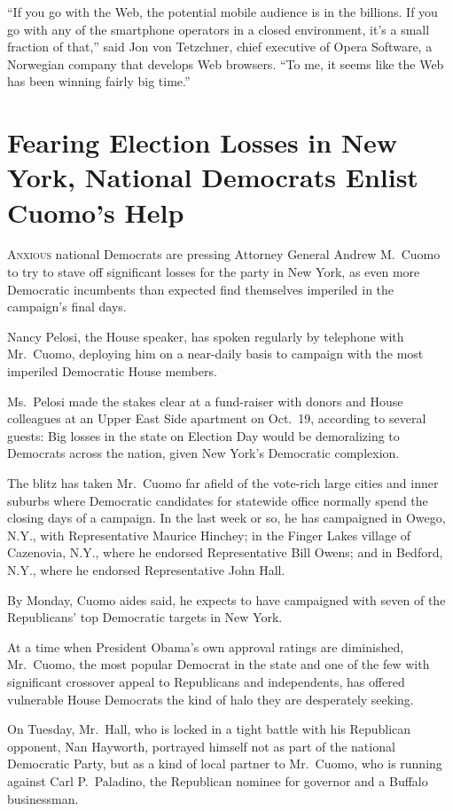 ﻿\documentclass[12pt]{article}
\begin{document}
``If you go with the Web, the potential mobile audience is in the billions. If you go with any of
the smartphone operators in a closed environment, it's a small fraction of that,'' said Jon von
Tetzchner, chief executive of Opera Software, a Norwegian company that develops Web browsers. ``To
me, it seems like the Web has been winning fairly big time.''

\section{Fearing Election Losses in New York, National Democrats Enlist Cuomo's Help}

\lettrine{A}{nxious} national Democrats are pressing Attorney General Andrew
M.~Cuomo to try to stave off significant losses for the party in New York, as even more Democratic
incumbents than expected find themselves imperiled in the campaign's final days.

Nancy Pelosi, the House speaker, has spoken regularly by telephone with Mr.~Cuomo, deploying him on
a near-daily basis to campaign with the most imperiled Democratic House members.

Ms.~Pelosi made the stakes clear at a fund-raiser with donors and House colleagues at an Upper East
Side apartment on Oct.~19, according to several guests: Big losses in the state on Election Day
would be demoralizing to Democrats across the nation, given New York's Democratic complexion.

The blitz has taken Mr.~Cuomo far afield of the vote-rich large cities and inner suburbs where
Democratic candidates for statewide office normally spend the closing days of a campaign. In the
last week or so, he has campaigned in Owego, N.Y., with Representative Maurice Hinchey; in the
Finger Lakes village of Cazenovia, N.Y., where he endorsed Representative Bill Owens; and in
Bedford, N.Y., where he endorsed Representative John Hall.

By Monday, Cuomo aides said, he expects to have campaigned with seven of the Republicans' top
Democratic targets in New York.

At a time when President Obama's own approval ratings are diminished, Mr.~Cuomo, the most popular
Democrat in the state and one of the few with significant crossover appeal to Republicans and
independents, has offered vulnerable House Democrats the kind of halo they are desperately seeking.

On Tuesday, Mr.~Hall, who is locked in a tight battle with his Republican opponent, Nan Hayworth,
portrayed himself not as part of the national Democratic Party, but as a kind of local partner to
Mr.~Cuomo, who is running against Carl P.~Paladino, the Republican nominee for governor and a
Buffalo businessman.
\end{document}
